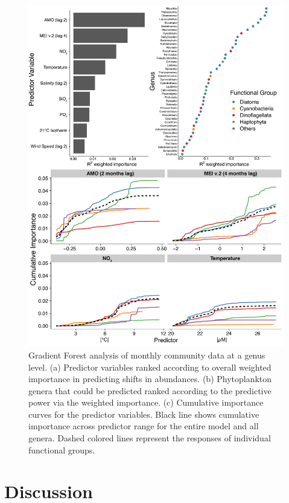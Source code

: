 \documentclass[draft]{agujournal2019}
\begin{document}
\begin{figure}
\noindent\includegraphics[width=\textwidth]{fig/GF_output_plot3_new.pdf}
\caption{Gradient Forest analysis of monthly community data at a genus level. (a) Predictor variables ranked according to overall weighted importance in predicting shifts in abundances. (b) Phytoplankton genera that could be predicted ranked according to the predictive power via the weighted importance. (c) Cumulative importance curves for the predictor variables. Black line shows cumulative importance across predictor range for the entire model and all genera. Dashed colored lines represent the responses of individual functional groups.}
\label{fig:GF}
\end{figure}


\section{Discussion}
\end{document}
